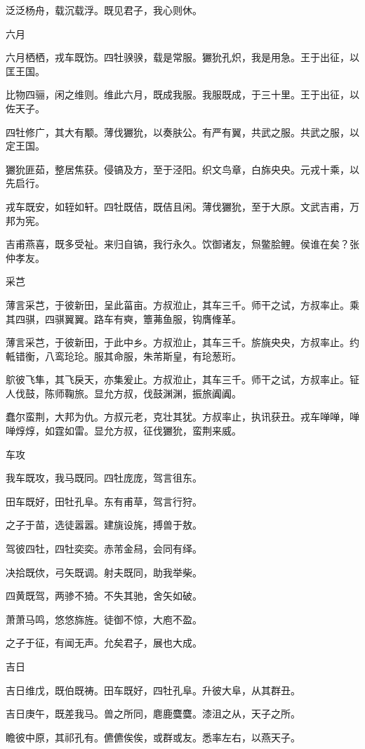 泛泛杨舟，载沉载浮。既见君子，我心则休。

六月

六月栖栖，戎车既饬。四牡骙骙，载是常服。玁狁孔炽，我是用急。王于出征，以匡王国。

比物四骊，闲之维则。维此六月，既成我服。我服既成，于三十里。王于出征，以佐天子。

四牡修广，其大有颙。薄伐玁狁，以奏肤公。有严有翼，共武之服。共武之服，以定王国。

玁狁匪茹，整居焦获。侵镐及方，至于泾阳。织文鸟章，白旆央央。元戎十乘，以先启行。

戎车既安，如轾如轩。四牡既佶，既佶且闲。薄伐玁狁，至于大原。文武吉甫，万邦为宪。

吉甫燕喜，既多受祉。来归自镐，我行永久。饮御诸友，炰鳖脍鲤。侯谁在矣？张仲孝友。

采芑

薄言采芑，于彼新田，呈此菑亩。方叔涖止，其车三千。师干之试，方叔率止。乘其四骐，四骐翼翼。路车有奭，簟茀鱼服，钩膺鞗革。

薄言采芑，于彼新田，于此中乡。方叔涖止，其车三千。旂旐央央，方叔率止。约軧错衡，八鸾玱玱。服其命服，朱芾斯皇，有玱葱珩。

鴥彼飞隼，其飞戾天，亦集爰止。方叔涖止，其车三千。师干之试，方叔率止。钲人伐鼓，陈师鞠旅。显允方叔，伐鼓渊渊，振旅阗阗。

蠢尔蛮荆，大邦为仇。方叔元老，克壮其犹。方叔率止，执讯获丑。戎车啴啴，啴啴焞焞，如霆如雷。显允方叔，征伐玁狁，蛮荆来威。

车攻

我车既攻，我马既同。四牡庞庞，驾言徂东。

田车既好，田牡孔阜。东有甫草，驾言行狩。

之子于苗，选徒嚣嚣。建旐设旄，搏兽于敖。

驾彼四牡，四牡奕奕。赤芾金舄，会同有绎。

决拾既佽，弓矢既调。射夫既同，助我举柴。

四黄既驾，两骖不猗。不失其驰，舍矢如破。

萧萧马鸣，悠悠旆旌。徒御不惊，大庖不盈。

之子于征，有闻无声。允矣君子，展也大成。

吉日

吉日维戊，既伯既祷。田车既好，四牡孔阜。升彼大阜，从其群丑。

吉日庚午，既差我马。兽之所同，麀鹿麌麌。漆沮之从，天子之所。

瞻彼中原，其祁孔有。儦儦俟俟，或群或友。悉率左右，以燕天子。

